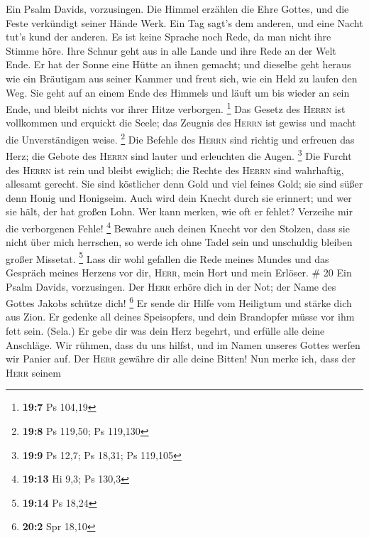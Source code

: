  Ein Psalm Davids, vorzusingen.  Die Himmel
erzählen die Ehre Gottes, und die Feste verkündigt seiner Hände Werk.
 Ein Tag sagt's dem anderen, und eine Nacht tut's kund der
anderen.  Es ist keine Sprache noch Rede, da man nicht
ihre Stimme höre.  Ihre Schnur geht aus in alle Lande und
ihre Rede an der Welt Ende. Er hat der Sonne eine Hütte an ihnen
gemacht;  und dieselbe geht heraus wie ein Bräutigam aus
seiner Kammer und freut sich, wie ein Held zu laufen den Weg.
 Sie geht auf an einem Ende des Himmels und läuft um bis
wieder an sein Ende, und bleibt nichts vor ihrer Hitze verborgen.
\footnote{\textbf{19:7} Ps 104,19}  Das Gesetz des
\textsc{Herrn} ist vollkommen und erquickt die Seele; das Zeugnis des
\textsc{Herrn} ist gewiss und macht die Unverständigen weise.
\footnote{\textbf{19:8} Ps 119,50; Ps 119,130}  Die
Befehle des \textsc{Herrn} sind richtig und erfreuen das Herz; die
Gebote des \textsc{Herrn} sind lauter und erleuchten die Augen.
\footnote{\textbf{19:9} Ps 12,7; Ps 18,31; Ps 119,105} 
Die Furcht des \textsc{Herrn} ist rein und bleibt ewiglich; die Rechte
des \textsc{Herrn} sind wahrhaftig, allesamt gerecht. 
Sie sind köstlicher denn Gold und viel feines Gold; sie sind süßer denn
Honig und Honigseim.  Auch wird dein Knecht durch sie
erinnert; und wer sie hält, der hat großen Lohn.  Wer
kann merken, wie oft er fehlet? Verzeihe mir die verborgenen Fehle!
\footnote{\textbf{19:13} Hi 9,3; Ps 130,3}  Bewahre auch
deinen Knecht vor den Stolzen, dass sie nicht über mich herrschen, so
werde ich ohne Tadel sein und unschuldig bleiben großer Missetat.
\footnote{\textbf{19:14} Ps 18,24}  Lass dir wohl
gefallen die Rede meines Mundes und das Gespräch meines Herzens vor dir,
\textsc{Herr}, mein Hort und mein Erlöser. \# 20  Ein
Psalm Davids, vorzusingen.  Der \textsc{Herr} erhöre dich
in der Not; der Name des Gottes Jakobs schütze dich! \footnote{\textbf{20:2}
  Spr 18,10}  Er sende dir Hilfe vom Heiligtum und stärke
dich aus Zion.  Er gedenke all deines Speisopfers, und
dein Brandopfer müsse vor ihm fett sein. (Sela.)  Er gebe
dir was dein Herz begehrt, und erfülle alle deine Anschläge.
 Wir rühmen, dass du uns hilfst, und im Namen unseres
Gottes werfen wir Panier auf. Der \textsc{Herr} gewähre dir alle deine
Bitten!  Nun merke ich, dass der \textsc{Herr} seinem
